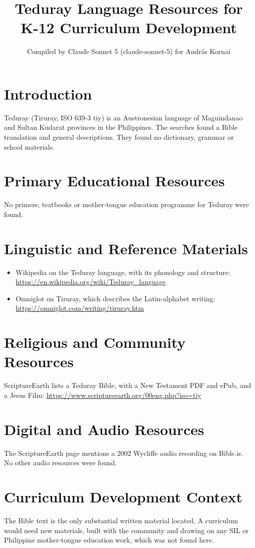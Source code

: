 \documentclass[12pt]{article}
\title{Teduray Language Resources for K-12 Curriculum Development}
\author{Compiled by Claude Sonnet 5 (claude-sonnet-5) for Andr\'as Kornai}
\date{}
\begin{document}
\maketitle
\section{Introduction}
Teduray (Tiruray, ISO 639-3 tiy) is an Austronesian language of Maguindanao and Sultan Kudarat provinces in the Philippines. The searches found a Bible translation and general descriptions. They found no dictionary, grammar or school materials.

\section{Primary Educational Resources}
No primers, textbooks or mother-tongue education programme for Teduray were found.

\section{Linguistic and Reference Materials}
\begin{itemize}
\item Wikipedia on the Teduray language, with its phonology and structure: \url{https://en.wikipedia.org/wiki/Teduray_language}
\item Omniglot on Tiruray, which describes the Latin-alphabet writing: \url{https://omniglot.com/writing/tiruray.htm}
\end{itemize}

\section{Religious and Community Resources}
ScriptureEarth lists a Teduray Bible, with a New Testament PDF and ePub, and a Jesus Film: \url{https://www.scriptureearth.org/00eng.php?iso=tiy}

\section{Digital and Audio Resources}
The ScriptureEarth page mentions a 2002 Wycliffe audio recording on Bible.is. No other audio resources were found.

\section{Curriculum Development Context}
The Bible text is the only substantial written material located. A curriculum would need new materials, built with the community and drawing on any SIL or Philippine mother-tongue education work, which was not found here.
\end{document}
